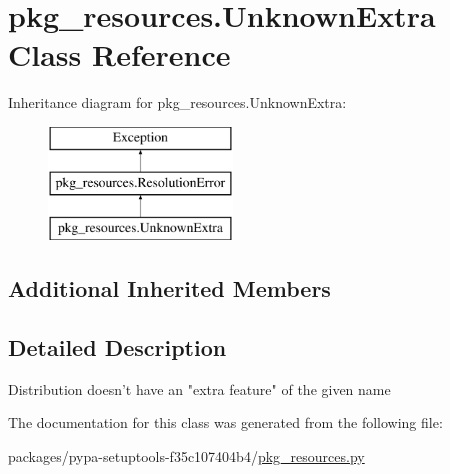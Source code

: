 \hypertarget{classpkg__resources_1_1UnknownExtra}{}\section{pkg\+\_\+resources.\+Unknown\+Extra Class Reference}
\label{classpkg__resources_1_1UnknownExtra}
Inheritance diagram for pkg\+\_\+resources.\+Unknown\+Extra\+:\begin{figure}[H]
\begin{center}
\leavevmode
\includegraphics[height=3.000000cm]{classpkg__resources_1_1UnknownExtra}
\end{center}
\end{figure}
\subsection*{Additional Inherited Members}


\subsection{Detailed Description}
\begin{DoxyVerb}Distribution doesn't have an "extra feature" of the given name\end{DoxyVerb}
 

The documentation for this class was generated from the following file\+:\begin{DoxyCompactItemize}
\item 
packages/pypa-\/setuptools-\/f35c107404b4/\hyperlink{pkg__resources_8py}{pkg\+\_\+resources.\+py}\end{DoxyCompactItemize}
